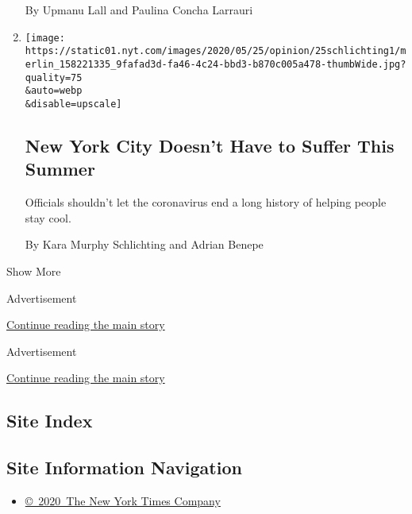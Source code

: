 \begin{enumerate}
  By Upmanu Lall and Paulina Concha Larrauri
\item
  \href{/2020/05/25/opinion/new-york-summer-coronavirus.html}{}

  \texttt{[image: https://static01.nyt.com/images/2020/05/25/opinion/25schlichting1/merlin\_158221335\_9fafad3d-fa46-4c24-bbd3-b870c005a478-thumbWide.jpg?quality=75\\\&auto=webp\\\&disable=upscale]}

  \hypertarget{new-york-city-doesnt-have-to-suffer-this-summer}{%
  \subsection{New York City Doesn't Have to Suffer This
  Summer}\label{new-york-city-doesnt-have-to-suffer-this-summer}}

  Officials shouldn't let the coronavirus end a long history of helping
  people stay cool.

  By Kara Murphy Schlichting and Adrian Benepe
\end{enumerate}

Show More

Advertisement

\protect\hyperlink{after-mid1}{Continue reading the main story}

Advertisement

\protect\hyperlink{after-mktg}{Continue reading the main story}

\hypertarget{site-index}{%
\subsection{Site Index}\label{site-index}}

\hypertarget{site-information-navigation}{%
\subsection{Site Information
Navigation}\label{site-information-navigation}}

\begin{itemize}
\tightlist
\item
  \href{https://help.nytimes.com/hc/en-us/articles/115014792127-Copyright-notice}{©~2020~The
  New York Times Company}
\end{itemize}

